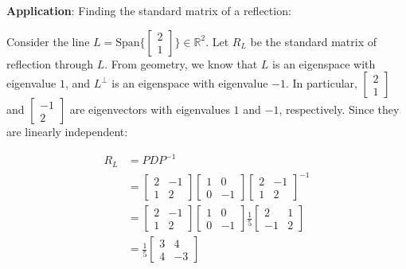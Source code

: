 \begin{paracol}{2}
\textbf{Application}: Finding the standard matrix of a reflection:

Consider the line $L = \text{Span} \Big\{ \begin{bmatrix}
    2 \\ 1
\end{bmatrix} \Big\} \in \mathbb{R}^2$. Let $R_L$ be the standard matrix of reflection through $L$. From geometry, we know that $L$ is an eigenspace with eigenvalue $1$, and $L^\perp$ is an eigenspace with eigenvalue $-1$. In particular, $\begin{bmatrix}
    2 \\ 1
\end{bmatrix}$ and $\begin{bmatrix}
    -1 \\ 2
\end{bmatrix}$ are eigenvectors with eigenvalues $1$ and $-1$, respectively. Since they are linearly independent:

\vspace{-20pt}

\begin{align*}
    R_L & = P D P^{-1} \\
    & = \begin{bmatrix}
        2 & -1 \\
        1 & 2
    \end{bmatrix} \begin{bmatrix}
        1 & 0 \\
        0 & -1
    \end{bmatrix} \begin{bmatrix}
        2 & -1 \\
        1 & 2
    \end{bmatrix}^{-1} \\
    & = \begin{bmatrix}
        2 & -1 \\
        1 & 2
    \end{bmatrix} \begin{bmatrix}
        1 & 0 \\
        0 & -1
    \end{bmatrix} \frac{1}{5} \begin{bmatrix}
        2 & 1 \\
        -1 & 2
    \end{bmatrix} \\
    & = \frac{1}{5} \begin{bmatrix}
        3 & 4 \\
        4 & -3
    \end{bmatrix}
\end{align*}


\end{paracol}

